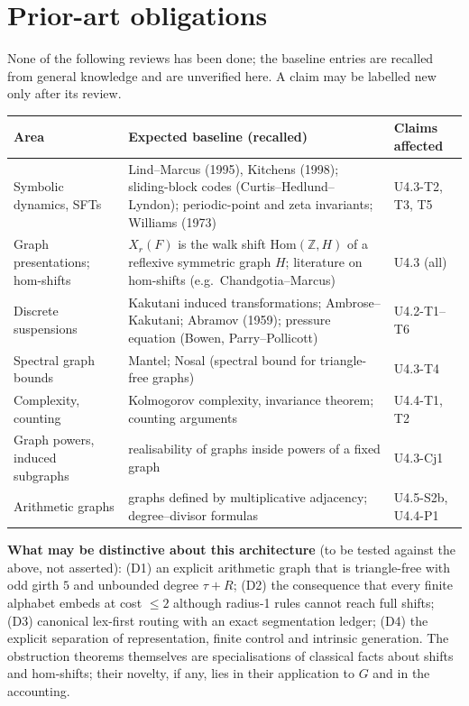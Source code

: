 \documentclass[11pt]{article}
\begin{document}
\section{Prior-art obligations}
None of the following reviews has been done; the baseline entries are recalled from general knowledge and are unverified here. A claim may be labelled new only after its review.
\begin{center}\footnotesize\begin{tabular}{@{}p{2.6cm}p{6.7cm}p{3.2cm}@{}}\toprule
Area & Expected baseline (recalled) & Claims affected\\\midrule
Symbolic dynamics, SFTs & Lind--Marcus (1995), Kitchens (1998); sliding-block codes (Curtis--Hedlund--Lyndon); periodic-point and zeta invariants; Williams (1973) & U4.3-T2, T3, T5\\
Graph presentations; hom-shifts & $X_r(F)$ is the walk shift $\mathrm{Hom}(\mathbb Z,H)$ of a reflexive symmetric graph $H$; literature on hom-shifts (e.g.\ Chandgotia--Marcus) & U4.3 (all)\\
Discrete suspensions & Kakutani induced transformations; Ambrose--Kakutani; Abramov (1959); pressure equation (Bowen, Parry--Pollicott) & U4.2-T1--T6\\
Spectral graph bounds & Mantel; Nosal (spectral bound for triangle-free graphs) & U4.3-T4\\
Complexity, counting & Kolmogorov complexity, invariance theorem; counting arguments & U4.4-T1, T2\\
Graph powers, induced subgraphs & realisability of graphs inside powers of a fixed graph & U4.3-Cj1\\
Arithmetic graphs & graphs defined by multiplicative adjacency; degree--divisor formulas & U4.5-S2b, U4.4-P1\\\bottomrule\end{tabular}\end{center}
\textbf{What may be distinctive about this architecture} (to be tested against the above, not asserted): (D1) an explicit arithmetic graph that is triangle-free with odd girth $5$ and unbounded degree $\tau+R$; (D2) the consequence that every finite alphabet embeds at cost $\le2$ although radius-1 rules cannot reach full shifts; (D3) canonical lex-first routing with an exact segmentation ledger; (D4) the explicit separation of representation, finite control and intrinsic generation. The obstruction theorems themselves are specialisations of classical facts about shifts and hom-shifts; their novelty, if any, lies in their application to $G$ and in the accounting.
\end{document}
